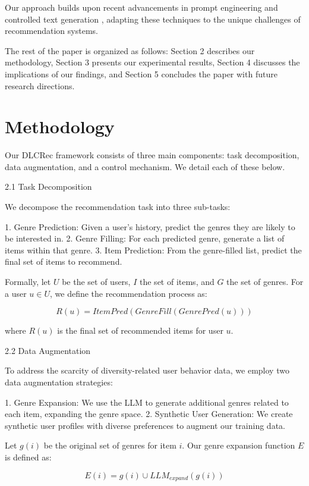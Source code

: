 \documentclass[12pt,letterpaper]{article}
\begin{document}
Our approach builds upon recent advancements in prompt engineering and controlled text generation \cite{li2022prefix}, adapting these techniques to the unique challenges of recommendation systems.

The rest of the paper is organized as follows: Section 2 describes our methodology, Section 3 presents our experimental results, Section 4 discusses the implications of our findings, and Section 5 concludes the paper with future research directions.

\section{Methodology}

Our DLCRec framework consists of three main components: task decomposition, data augmentation, and a control mechanism. We detail each of these below.

2.1 Task Decomposition

We decompose the recommendation task into three sub-tasks:

1. Genre Prediction: Given a user's history, predict the genres they are likely to be interested in.
2. Genre Filling: For each predicted genre, generate a list of items within that genre.
3. Item Prediction: From the genre-filled list, predict the final set of items to recommend.

Formally, let $U$ be the set of users, $I$ the set of items, and $G$ the set of genres. For a user $u \in U$, we define the recommendation process as:

\begin{equation}
R(u) = ItemPred(GenreFill(GenrePred(u)))
\end{equation}

where $R(u)$ is the final set of recommended items for user $u$.

2.2 Data Augmentation

To address the scarcity of diversity-related user behavior data, we employ two data augmentation strategies:

1. Genre Expansion: We use the LLM to generate additional genres related to each item, expanding the genre space.
2. Synthetic User Generation: We create synthetic user profiles with diverse preferences to augment our training data.

Let $g(i)$ be the original set of genres for item $i$. Our genre expansion function $E$ is defined as:

\begin{equation}
E(i) = g(i) \cup LLM_{expand}(g(i))
\end{equation}
\end{document}
